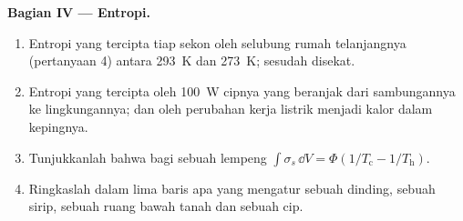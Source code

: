 \begin{problem}
\textbf{Bagian IV --- Entropi.}
\begin{enumerate}[resume]
  \item Entropi yang tercipta tiap sekon oleh selubung rumah telanjangnya
        (pertanyaan 4) antara \qty{293}{K} dan \qty{273}{K}; sesudah
        disekat.
  \item Entropi yang tercipta oleh \qty{100}{W} cipnya yang beranjak dari
        sambungannya ke lingkungannya; dan oleh perubahan kerja listrik
        menjadi kalor dalam kepingnya.
  \item Tunjukkanlah bahwa bagi sebuah lempeng $\int\sigma_s\,\dd V = \Phi(1/T_{\text{c}} -
        1/T_{\text{h}})$.
  \item Ringkaslah dalam lima baris apa yang mengatur sebuah dinding, sebuah sirip, sebuah ruang bawah tanah
        dan sebuah cip.
\end{enumerate}
\end{problem}
